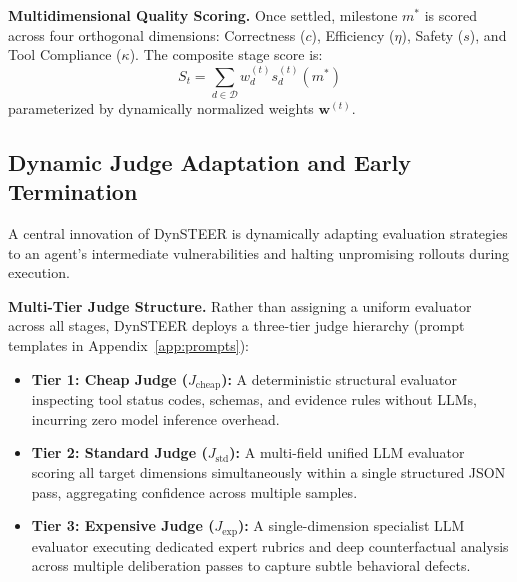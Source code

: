 \textbf{Multidimensional Quality Scoring.} Once settled, milestone $m^*$ is scored across four orthogonal dimensions: Correctness ($c$), Efficiency ($\eta$), Safety ($s$), and Tool Compliance ($\kappa$). The composite stage score is:
\begin{equation}
    S_t = \sum_{d \in \mathcal{D}} w_d^{(t)} s_d^{(t)}(m^*)
    \label{eq:stage_scoring}
\end{equation}
parameterized by dynamically normalized weights $\mathbf{w}^{(t)}$.

\subsection{Dynamic Judge Adaptation and Early Termination}
\label{sec:routing_early_stop}
A central innovation of DynSTEER is dynamically adapting evaluation strategies to an agent's intermediate vulnerabilities and halting unpromising rollouts during execution.

\textbf{Multi-Tier Judge Structure.} Rather than assigning a uniform evaluator across all stages, DynSTEER deploys a three-tier judge hierarchy (prompt templates in Appendix~\ref{app:prompts}):
\begin{itemize}[leftmargin=*,itemsep=1.5pt,topsep=1pt]
    \item \textbf{Tier 1: Cheap Judge ($J_{\text{cheap}}$):} A deterministic structural evaluator inspecting tool status codes, schemas, and evidence rules without LLMs, incurring zero model inference overhead.
    \item \textbf{Tier 2: Standard Judge ($J_{\text{std}}$):} A multi-field unified LLM evaluator scoring all target dimensions simultaneously within a single structured JSON pass, aggregating confidence across multiple samples.
    \item \textbf{Tier 3: Expensive Judge ($J_{\text{exp}}$):} A single-dimension specialist LLM evaluator executing dedicated expert rubrics and deep counterfactual analysis across multiple deliberation passes to capture subtle behavioral defects.
\end{itemize}

